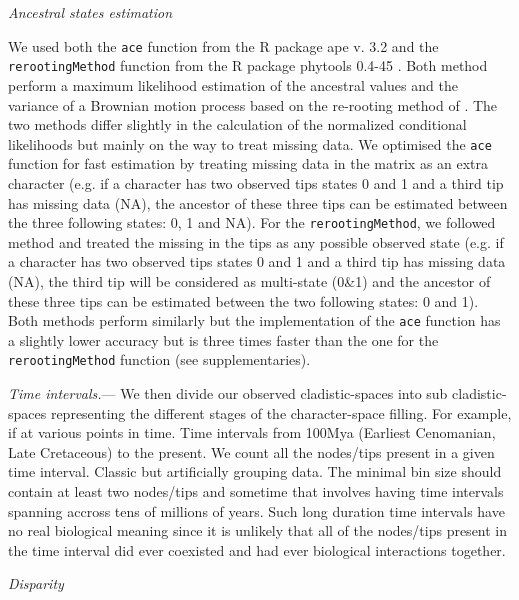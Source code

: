 \documentclass[12pt,letterpaper]{article}
\renewcommand{\subsection}[1]{%
\bigskip
\begin{center}
\begin{large}
\normalfont\itshape #1
\end{large}
\end{center}}
\renewcommand{\subsubsection}[1]{%
\vspace{2ex}
\noindent
\textit{#1.}---}
\begin{document}
\subsection{Ancestral states estimation}
We used both the \texttt{ace} function from the R package ape v. 3.2 \cite{paradisape:2004} and the 
\texttt{rerootingMethod} function from the R package phytools 0.4-45 \cite{phytools}. Both method perform a maximum likelihood estimation of the ancestral values and the variance of a Brownian motion process based on the re-rooting method of \cite{Yang01121995}. The two methods differ slightly in the calculation of the normalized conditional likelihoods but mainly on the way to treat missing data. We optimised the \texttt{ace} function for fast estimation by treating missing data in the matrix as an extra character (e.g. if a character has two observed tips states 0 and 1 and a third tip has missing data (NA), the ancestor of these three tips can be estimated between the three following states: 0, 1 and NA). For the \texttt{rerootingMethod}, we followed \cite{Claddis} method and treated the missing in the tips as any possible observed state (e.g. if a character has two observed tips states 0 and 1 and a third tip has missing data (NA), the third tip will be considered as multi-state (0\&1) and the ancestor of these three tips can be estimated between the two following states: 0 and 1). Both methods perform similarly but the implementation of the \texttt{ace} function has a slightly lower accuracy  but is three times faster than the one for the \texttt{rerootingMethod} function (see supplementaries).

\subsubsection{Time intervals}
We then divide our observed cladistic-spaces into sub cladistic-spaces representing the different stages of the character-space filling. For example, if at various points in time.
Time intervals from 100Mya (Earliest Cenomanian, Late Cretaceous) to the present.
We count all the nodes/tips present in a given time interval.
Classic but artificially grouping data. The minimal bin size should contain at least two nodes/tips and sometime that involves having time intervals spanning accross tens of millions of years. Such long duration time intervals have no real biological meaning since it is unlikely that all of the nodes/tips present in the time interval did ever coexisted and had ever biological interactions together.


\subsection{Disparity}
\end{document}
